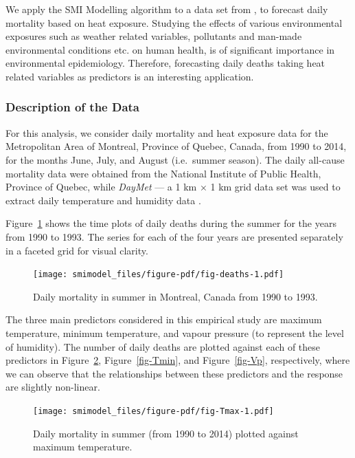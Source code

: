 \documentclass[11pt,a4paper,]{article}
\begin{document}
We apply the SMI Modelling algorithm to a data set from
\textcite{Masselot2022}, to forecast daily mortality based on heat
exposure. Studying the effects of various environmental exposures such
as weather related variables, pollutants and man-made environmental
conditions etc. on human health, is of significant importance in
environmental epidemiology. Therefore, forecasting daily deaths taking
heat related variables as predictors is an interesting application.

\hypertarget{description-of-the-data}{%
\subsubsection{Description of the Data}\label{description-of-the-data}}

For this analysis, we consider daily mortality and heat exposure data
for the Metropolitan Area of Montreal, Province of Quebec, Canada, from
1990 to 2014, for the months June, July, and August (i.e.~summer
season). The daily all-cause mortality data were obtained from the
National Institute of Public Health, Province of Quebec, while
\emph{DayMet} --- a 1 km × 1 km grid data set \autocite{Thornton2021}
was used to extract daily temperature and humidity data
\autocite{Masselot2022}.

Figure~\ref{fig-deaths} shows the time plots of daily deaths during the
summer for the years from 1990 to 1993. The series for each of the four
years are presented separately in a faceted grid for visual clarity.

\begin{figure}

{\centering \texttt{[image: smimodel\_files/figure-pdf/fig-deaths-1.pdf]}

}

\caption{\label{fig-deaths}Daily mortality in summer in Montreal, Canada
from 1990 to 1993.}

\end{figure}

The three main predictors considered in this empirical study are maximum
temperature, minimum temperature, and vapour pressure (to represent the
level of humidity). The number of daily deaths are plotted against each
of these predictors in Figure~\ref{fig-Tmax}, Figure~\ref{fig-Tmin}, and
Figure~\ref{fig-Vp}, respectively, where we can observe that the
relationships between these predictors and the response are slightly
non-linear.

\begin{figure}

{\centering \texttt{[image: smimodel\_files/figure-pdf/fig-Tmax-1.pdf]}

}

\caption{\label{fig-Tmax}Daily mortality in summer (from 1990 to 2014)
plotted against maximum temperature.}

\end{figure}
\end{document}
